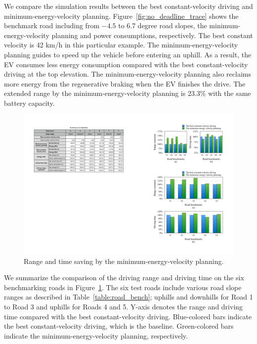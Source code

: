 \documentclass{IEEEtran}
\begin{document}
We compare the simulation results between the best constant-velocity driving and minimum-energy-velocity planning. Figure~\ref{fig:no_deadline_trace} shows the benchmark road including from $-4.5$ to 6.7 degree road slopes, the minimum-energy-velocity planning and power consumptions, respectively. The best constant velocity is 42 km/h in this particular example. The minimum-energy-velocity planning guides to speed up the vehicle before entering an uphill. As a result, the EV consumes less energy consumption compared with the best constant-velocity driving at the top elevation. The minimum-energy-velocity planning also reclaims more energy from the regenerative braking when the EV finishes the drive. The extended range by the minimum-energy-velocity planning is 23.3\% with the same battery capacity.

\begin{figure}	 %
\includegraphics[width=1.0\hsize]{Figures/no_deadline_bar.pdf}
\caption{Range and time saving by the minimum-energy-velocity planning.}
\label{fig:no_deadline_bar}
\end{figure} 

We summarize the comparison of the driving range and driving time on the six benchmarking roads in Figure~\ref{fig:no_deadline_bar}. The six test roads include various road slope ranges as described in Table~\ref{table:road_bench}; uphills and downhills for Road 1 to Road 3 and uphills for Roads 4 and 5. Y-axis denotes the range and driving time compared with the best constant-velocity driving. Blue-colored bars indicate the best constant-velocity driving, which is the baseline. Green-colored bars indicate the minimum-energy-velocity planning, respectively.
\end{document}
